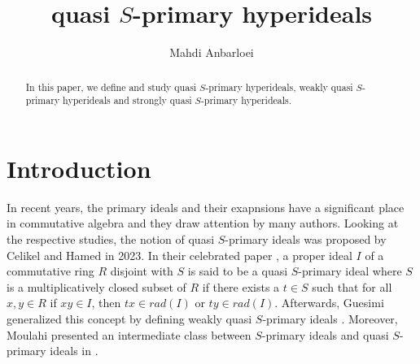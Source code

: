 \documentclass[preprint,review,10pt]{amsart}
\theoremstyle{definition}
\theoremstyle{remark}
\numberwithin{equation}{section}
\begin{document}
\title{  quasi $S$-primary hyperideals }

\author{Mahdi Anbarloei}
\address{Department of Mathematics, Faculty of Sciences,
Imam Khomeini International University, Qazvin, Iran.
}






 

\begin{abstract}
In this paper, we define and study  quasi $S$-primary hyperideals, weakly quasi $S$-primary hyperideals and strongly quasi $S$-primary hyperideals.

\end{abstract}
\maketitle

\section{Introduction}
In recent years, the primary ideals and their exapnsions have a significant 
place in commutative algebra and they draw attention by many authors. Looking
at the respective studies, the notion of quasi $S$-primary ideals  was proposed by Celikel and Hamed in 2023. In their celebrated paper \cite{Celikel}, a proper ideal $I$ of a commutative ring $R$ disjoint with $S$ is said to be a quasi $S$-primary ideal where $S$ is a multiplicatively closed subset  of $R$ if there exists a $t \in S$ such that for all $x,y \in R$ if $xy \in I$, then $tx \in rad(I)$ or $ty \in rad(I)$. Afterwards, Guesimi generalized this concept by defining weakly quasi $S$-primary ideals \cite{Guesmi}. Moreover, Moulahi presented  an intermediate class between $S$-primary ideals and quasi $S$-primary ideals in \cite{Moulahi}.
\end{document}
